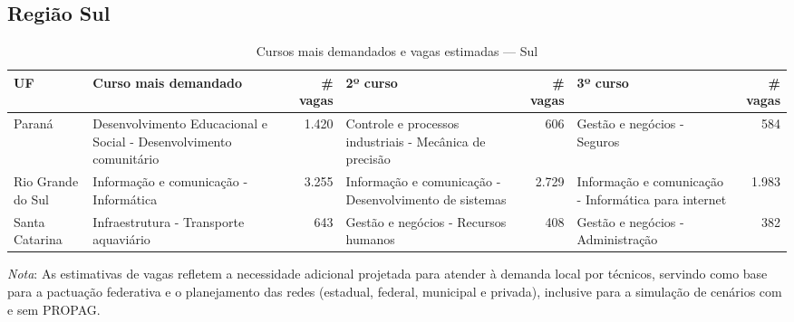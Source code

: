 \subsection{Região Sul}
\begin{table}[ht]
\centering
\caption{Cursos mais demandados e vagas estimadas — Sul}
\label{tab:sul}
\begin{tabular}{l l r l r l r}
\toprule
UF & Curso mais demandado & \# vagas & 2º curso & \# vagas & 3º curso & \# vagas \\
\midrule
Paraná & Desenvolvimento Educacional e Social - Desenvolvimento comunitário & 1.420 & Controle e processos industriais - Mecânica de precisão & 606 & Gestão e negócios - Seguros & 584 \\
Rio Grande do Sul & Informação e comunicação - Informática & 3.255 & Informação e comunicação - Desenvolvimento de sistemas & 2.729 & Informação e comunicação - Informática para internet & 1.983 \\
Santa Catarina & Infraestrutura - Transporte aquaviário & 643 & Gestão e negócios - Recursos humanos & 408 & Gestão e negócios - Administração & 382 \\
\bottomrule
\end{tabular}
\end{table}

\noindent\textit{Nota}: As estimativas de vagas refletem a necessidade adicional projetada para atender à demanda local por técnicos, servindo como base para a pactuação federativa e o planejamento das redes (estadual, federal, municipal e privada), inclusive para a simulação de cenários com e sem PROPAG.
